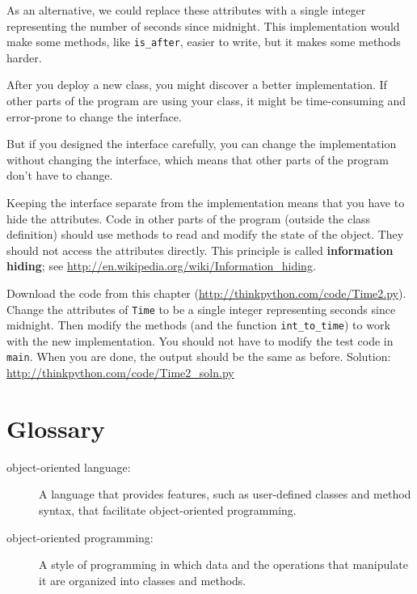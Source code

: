 \documentclass[10pt]{book}
\begin{document}
\begin{CJK}{UTF8}{gbsn}
As an alternative, we could replace these attributes with
a single integer representing the number of seconds
since midnight.  This implementation would make some methods,
like \verb"is_after", easier to write, but it makes some methods
harder.

After you deploy a new class, you might discover a better
implementation.  If other parts of the program are using your
class, it might be time-consuming and error-prone to change the
interface.  

But if you designed the interface carefully, you can
change the implementation without changing the interface, which
means that other parts of the program don't have to change.

Keeping the interface separate from the implementation means that
you have to hide the attributes.  Code in other parts of the program
(outside the class definition) should use methods to read
and modify the state of the object.  They should not access the
attributes directly.  This principle is called {\bf information hiding};
see \url{http://en.wikipedia.org/wiki/Information_hiding}.

\begin{exercise}

Download the code from this chapter
(\url{http://thinkpython.com/code/Time2.py}).  Change the attributes
of {\tt Time} to be a single integer representing seconds since
midnight.  Then modify the methods (and the function
\verb"int_to_time") to work with the new implementation.  You should
not have to modify the test code in {\tt main}.  When you are done,
the output should be the same as before.  Solution:
\url{http://thinkpython.com/code/Time2_soln.py}

\end{exercise}


\section{Glossary}

\begin{description}

\item[object-oriented language:] A language that provides features,
  such as user-defined classes and method syntax, that facilitate
  object-oriented programming.

\item[object-oriented programming:] A style of programming in which
data and the operations that manipulate it are organized into classes
and methods.


\end{description}
\end{CJK}
\end{document}
